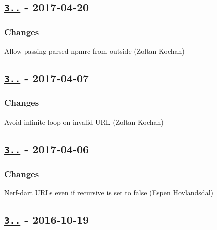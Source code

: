 \subsection*{\href{https://github.com/rexxars/registry-auth-token/compare/v3.1.2...v3.2.0}{\tt 3..} -\/ 2017-\/04-\/20}

\subsubsection*{Changes}


\begin{DoxyItemize}
\item Allow passing parsed npmrc from outside (Zoltan Kochan)
\end{DoxyItemize}

\subsection*{\href{https://github.com/rexxars/registry-auth-token/compare/v3.1.1...v3.1.2}{\tt 3..} -\/ 2017-\/04-\/07}

\subsubsection*{Changes}


\begin{DoxyItemize}
\item Avoid infinite loop on invalid U\+RL (Zoltan Kochan)
\end{DoxyItemize}

\subsection*{\href{https://github.com/rexxars/registry-auth-token/compare/v3.1.0...v3.1.1}{\tt 3..} -\/ 2017-\/04-\/06}

\subsubsection*{Changes}


\begin{DoxyItemize}
\item Nerf-\/dart U\+R\+Ls even if recursive is set to false (Espen Hovlandsdal)
\end{DoxyItemize}

\subsection*{\href{https://github.com/rexxars/registry-auth-token/compare/v3.0.1...v3.1.0}{\tt 3..} -\/ 2016-\/10-\/19}


